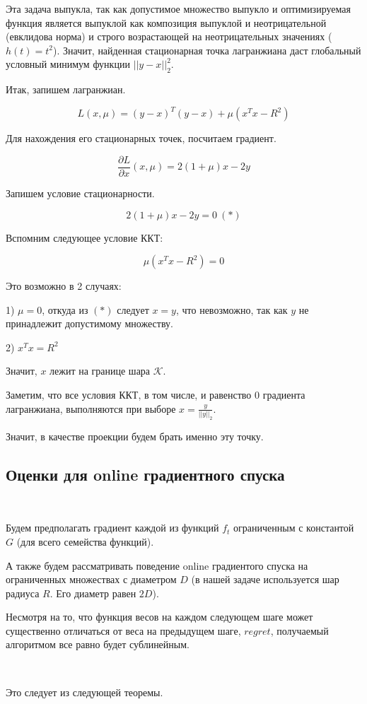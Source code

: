 \documentclass[12pt]{article}
\begin{document}
	Эта задача выпукла, так как допустимое множество выпукло и оптимизируемая функция является выпуклой как композиция выпуклой и неотрицательной (евклидова норма) и строго возрастающей на неотрицательных значениях ($h(t) = t^2$).
	Значит, найденная стационарная точка лагранжиана даст глобальный условный минимум функции $||y-x||_2^2$.
	
	Итак, запишем лагранжиан.
	
	$$L(x, \mu) = (y-x)^T(y-x) + \mu(x^Tx - R^2)$$	
	
	Для нахождения его стационарных точек, посчитаем градиент.
	
	$$\frac{\partial L}{\partial x}(x, \mu) = 2(1+\mu)x - 2y$$
	
Запишем условие	стационарности.
	
	$$2(1+\mu)x - 2y = 0\ (*)$$ 
	
	Вспомним следующее условие ККТ:
	
	$$\mu(x^Tx-R^2) = 0$$
	
	Это возможно в 2 случаях:
	
	1) $\mu = 0$, откуда из $(*)$ следует $x=y$, что невозможно, так как $y$ не принадлежит допустимому множеству.
	
	2) $x^Tx = R^2$
	
	Значит, $x$ лежит на границе шара $\mathcal{K}$.
	
	Заметим, что все условия ККТ, в том числе, и равенство 0 градиента лагранжиана, выполняются при выборе $x = \frac{y}{||y||_2}$.
	
	Значит, в качестве проекции будем брать именно эту точку.

\subsection{Оценки для online градиентного спуска}
$ $

Будем предполагать градиент каждой из функций $f_t$ ограниченным с константой $G$ (для всего семейства функций).

А также будем рассматривать поведение online градиентого спуска на ограниченных множествах с диаметром $D$ (в нашей задаче используется шар радиуса $R$. Его диаметр равен $2D$).

Несмотря на то, что функция весов на каждом следующем шаге может существенно отличаться от веса на предыдущем шаге, $regret$, получаемый алгоритмом все равно будет сублинейным.

$ $

Это следует из следующей теоремы.
\end{document}
